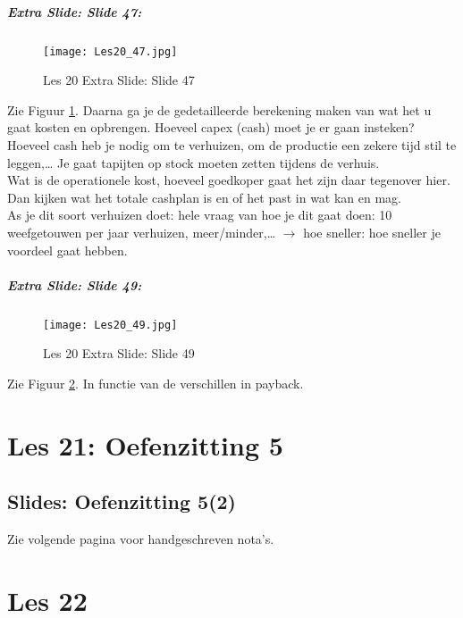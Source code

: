 \documentclass[10pt,a4paper]{report}
\begin{document}
\paragraph{Extra Slide: Slide 47:}

\begin{figure}[h!]
\centering
\texttt{[image: Les20\_47.jpg]}
\caption{Les 20 Extra Slide: Slide 47} 
\label{les20_47}
\end{figure}

Zie Figuur \ref{les20_47}. Daarna ga je de gedetailleerde berekening maken van wat het u gaat kosten en opbrengen. Hoeveel capex (cash) moet je er gaan insteken? Hoeveel cash heb je nodig om te verhuizen, om de productie een zekere tijd stil te leggen,… Je gaat tapijten op stock moeten zetten tijdens de verhuis.\\
Wat is de operationele kost, hoeveel goedkoper gaat het zijn daar tegenover hier. Dan kijken wat het totale cashplan is en of het past in wat kan en mag.\\
As je dit soort verhuizen doet: hele vraag van hoe je dit gaat doen: 10 weefgetouwen per jaar verhuizen, meer/minder,… $\rightarrow$ hoe sneller: hoe sneller je voordeel gaat hebben.

\paragraph{Extra Slide: Slide 49:}

\begin{figure}[h!]
\centering
\texttt{[image: Les20\_49.jpg]}
\caption{Les 20 Extra Slide: Slide 49} 
\label{les20_49}
\end{figure}

Zie Figuur \ref{les20_49}. In functie van de verschillen in payback.

\chapter{Les 21: Oefenzitting 5}
\section{Slides: Oefenzitting 5(2)}
Zie volgende pagina voor handgeschreven nota's.

 

\chapter{Les 22}
\end{document}
